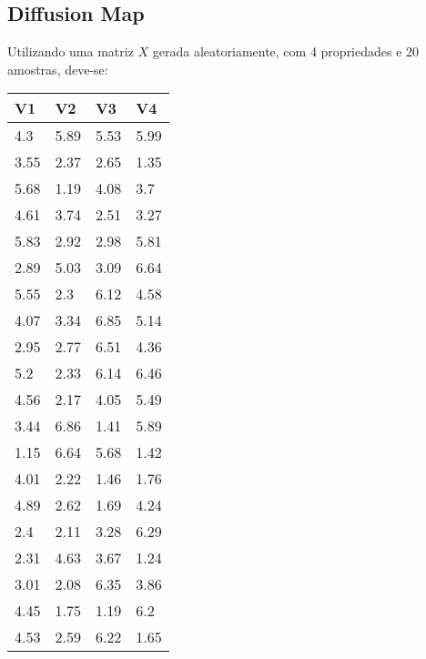 \documentclass{article}
\begin{document}
        \subsection{Diffusion Map}

            Utilizando uma matriz $X$ gerada aleatoriamente, com 4 propriedades e 20 amostras, deve-se:

            \begin{center}
                \begin{tabular}{llll}
                    V1         & V2         & V3         & V4           \\
                    \hline
                    4.3 & 5.89 & 5.53 & 5.99 \\
                    3.55 & 2.37 & 2.65 & 1.35 \\
                    5.68 & 1.19 & 4.08 & 3.7 \\
                    4.61 & 3.74 & 2.51 & 3.27 \\
                    5.83 & 2.92 & 2.98 & 5.81 \\
                    2.89 & 5.03 & 3.09 & 6.64 \\
                    5.55 & 2.3 & 6.12 & 4.58 \\
                    4.07 & 3.34 & 6.85 & 5.14 \\
                    2.95 & 2.77 & 6.51 & 4.36 \\
                    5.2 & 2.33 & 6.14 & 6.46 \\
                    4.56 & 2.17 & 4.05 & 5.49 \\
                    3.44 & 6.86 & 1.41 & 5.89 \\
                    1.15 & 6.64 & 5.68 & 1.42 \\
                    4.01 & 2.22 & 1.46 & 1.76 \\
                    4.89 & 2.62 & 1.69 & 4.24 \\
                    2.4 & 2.11 & 3.28 & 6.29 \\
                    2.31 & 4.63 & 3.67 & 1.24 \\
                    3.01 & 2.08 & 6.35 & 3.86 \\
                    4.45 & 1.75 & 1.19 & 6.2 \\
                    4.53 & 2.59 & 6.22 & 1.65
                \end{tabular}
            \end{center}
\end{document}
